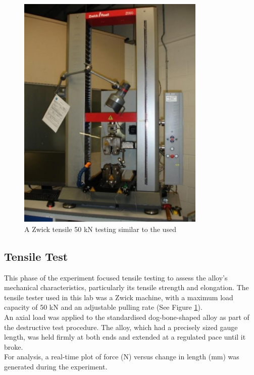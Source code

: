 \documentclass{article}
\begin{document}
\begin{minipage}{0.4\textwidth}
    \begin{figure}[H]
    \centering
    \includegraphics[width=0.8\textwidth]{images/tensile_machine.jpg}
    \caption{A Zwick tensile 50 kN testing similar to the used}
    \label{fig:tensile_machine}
    \end{figure}
\end{minipage}\hfill
\begin{minipage}{0.555\textwidth}
\subsection{Tensile Test}
This phase of the experiment focused tensile testing to assess the alloy's mechanical characteristics, particularly its tensile strength and elongation. The tensile tester used in this lab was a {Zwick machine}, with a maximum load capacity of 50 kN and an adjustable pulling rate (See Figure \ref{fig:tensile_machine}).\\[8pt]
An axial load was applied to the standardised dog-bone-shaped alloy as part of the destructive test procedure. The alloy, which had a precisely sized gauge length, was held firmly at both ends and extended at a regulated pace until it broke.\\[8pt]
For analysis, a real-time plot of force (N) versus change in length (mm) was generated during the experiment.
\end{minipage}\\[8pt]
\end{document}
